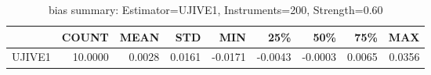 \begin{table}[ht]
\centering
\caption{bias summary: Estimator=UJIVE1, Instruments=200, Strength=0.60}
\begin{tabular}{lrrrrrrrr}
\toprule
 & COUNT & MEAN & STD & MIN & 25\% & 50\% & 75\% & MAX \\
\midrule
UJIVE1 & 10.0000 & 0.0028 & 0.0161 & -0.0171 & -0.0043 & -0.0003 & 0.0065 & 0.0356 \\
\bottomrule
\end{tabular}
\end{table}
